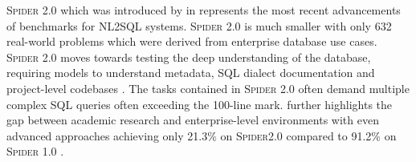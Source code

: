 \textsc{Spider 2.0} which was introduced by \citeauthor*{Spider2} in
\citeyear{Spider2} represents the most recent advancements of benchmarks for
NL2SQL systems. \textsc{Spider 2.0} is much smaller with only 632 real-world
problems which were derived from enterprise database use cases. \textsc{Spider
2.0} moves towards testing the deep understanding of the database, requiring
models to understand metadata, SQL dialect documentation and project-level
codebases \citep{Spider2}. The tasks contained in \textsc{Spider 2.0} often
demand multiple complex SQL queries often exceeding the 100-line mark.
\citeauthor{Spider2} further highlights the gap between academic research and
enterprise-level environments with even advanced approaches achieving only
21.3\% on \textsc{Spider2.0} compared to 91.2\% on \textsc{Spider 1.0}
\citep{Spider, Spider2}.
